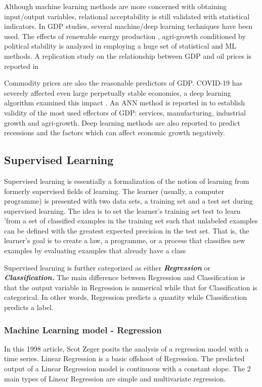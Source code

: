 Although machine learning methods are more concerned with obtaining input/output variables, relational acceptability is still validated with statistical indicators. In GDP studies, several machine/deep learning techniques have been used. The effects of renewable energy production \cite{perera2014machine}, agri-growth conditioned by political stability is analyzed in  employing a huge set of statistical and ML methods. A replication study on the relationship between GDP and oil prices is reported in\cite{charfeddine2020reviewing}

Commodity prices are also the reasonable predictors of GDP. COVID-19 has severely affected even large perpetually stable economies, a deep learning algorithm examined this impact \cite{jena2021impact}. An ANN method is reported in \cite{milavcic2017application}to establish validity of the most used effectors of GDP: services, manufacturing, industrial growth and agri-growth. Deep learning methods are also reported to predict recessions \cite{vrontos2020modeling} and the factors which can affect economic growth negatively.


\subsection{Supervised Learning}
Supervised learning is essentially a formalization of the notion of learning from formerly supervised fields of learning. The learner (usually, a computer programme) is presented with two data sets, a training set and a test set during supervised learning. The idea is to set the learner's training set test to learn 'from a set of classified examples in the training set such that unlabeled examples can be defined with the greatest expected precision in the test set. That is, the learner's goal is to create a law, a programme, or a process that classifies new examples by evaluating examples that already have a class \cite{learned2014introduction}

Supervised learning is further categorized as  either \textbf{\textit{Regression}} or \textbf{\textit{Classification.}} The main difference between Regression and Classification is that the output variable in Regression is numerical while that for Classification is categorical. In other words, Regression predicts a quantity while  Classification predicts a label.


\subsubsection{Machine Learning model - Regression}
In this 1998 article, \cite{zeger1988regression} Scot Zeger posits the analysis of a regression model with a time series. Linear Regression is a basic offshoot of Regression. The predicted output of a Linear Regression model is continuous with a constant slope. The 2 main types of Linear Regression are simple and multivariate regression. 

